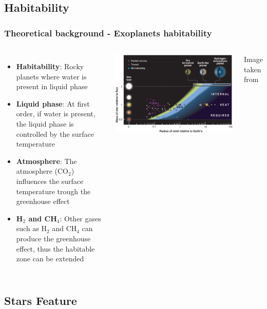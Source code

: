 \documentclass[compress]{beamer}
\begin{document}
\subsection{Habitability}
\begin{frame}
\frametitle{Theoretical background - Exoplanets habitability }
\begin{columns}
\begin{itemize}
\item\textbf{Habitability}: Rocky planets where water is present in liquid phase 
\item\textbf{Liquid phase}: At first order, if water is present, the liquid phase is controlled by the surface temperature 
\item\textbf{Atmosphere}: The atmosphere (CO$_{2}$) influences the surface temperature trough the greenhouse effect
\item\textbf{H$_{2}$ and CH$_{4}$}: Other gases such as H$_{2}$ and CH$_{4}$ can produce the greenhouse effect, thus the habitable zone can be extended 
\end{itemize}
\includegraphics[width=\linewidth,]{Pic/Planets_habitability_Seager.png}\\
\begin{center}
Image taken from \cite{seager2013exoplanet}
\end{center}

\end{columns}
\end{frame}


\subsection{Stars Feature}
\end{document}
